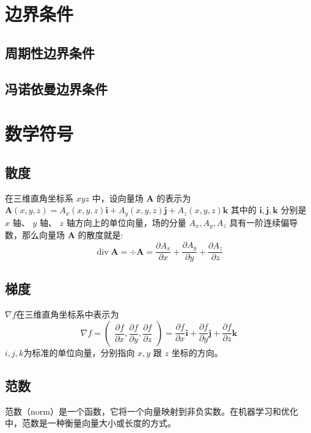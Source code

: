 \documentclass{article}
\numberwithin{equation}{subsection}    %
\begin{document}
\newpage
\begin{appendix}
    \section{边界条件}
    \subsection{周期性边界条件}
    \subsection{冯诺依曼边界条件}
    \section{数学符号}
    \subsection{散度}
    在三维直角坐标系  $x y z$  中，设向量场  $\boldsymbol{A}$  的表示为
    $\boldsymbol{A}(x, y, z)=A_{x}(x, y, z) \boldsymbol{i}+A_{y}(x, y, z) \boldsymbol{j}+A_{z}(x, y, z) \boldsymbol{k}$ 其中的  $\boldsymbol{i}, \boldsymbol{j}, \boldsymbol{k} $ 分别是  $x$  轴、  $y$  轴、  $z$  轴方向上的单位向量，场的分量  $A_{x}, A_{y}, A_{z}$  具有一阶连续偏导数，那么向量场  $\boldsymbol{A}$  的散度就是:
    \begin{equation}
        \operatorname{div} \boldsymbol{A}=\div \boldsymbol{A}=\dfrac{\partial A_{x}}{\partial x}+\dfrac{\partial A_{y}}{\partial y}+\dfrac{\partial A_{z}}{\partial z}
    \end{equation}
    \subsection{梯度}
    $\nabla f$在三维直角坐标系中表示为
    \begin{equation}
        {\displaystyle \nabla f={\begin{pmatrix}{\dfrac {\partial f}{\partial x}},{\dfrac {\partial f}{\partial y}},{\dfrac {\partial f}{\partial z}}\end{pmatrix}}={\dfrac {\partial f}{\partial x}}\mathbf {i} +{\dfrac {\partial f}{\partial y}}\mathbf {j} +{\dfrac {\partial f}{\partial z}}\mathbf {k} }
    \end{equation}
    $i, j, k $为标准的单位向量，分别指向 $x, y$ 跟 $z$ 坐标的方向。
    \subsection{范数}
    范数（norm）是一个函数，它将一个向量映射到非负实数。在机器学习和优化中，范数是一种衡量向量大小或长度的方式。


\end{appendix}
\end{document}

